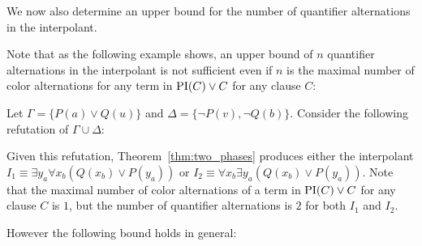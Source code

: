 We now also determine an upper bound for the number of quantifier alternations in the interpolant.

Note that as the following example shows, 
an upper bound of $n$ quantifier alternations in the interpolant is not sufficient even if $n$ is the maximal number of color alternations for any term in $\PI(C) \lor C$ for any clause $C$:

\begin{exa}
	Let $\Gamma = \{ P(a) \lor Q(u) \}$ and $\Delta = \{ \lnot P(v), \lnot Q(b) \}$.
	Consider the following refutation of $\Gamma \cup \Delta$:
	\begin{prooftree}


	\end{prooftree}

	Given this refutation, Theorem~\ref{thm:two_phases} produces either the interpolant
	$I_1 \equiv \exists y_a \forall x_b ( Q(x_b) \lor P(y_a) )$
	or 
	$I_2 \equiv \forall x_b \exists y_a ( Q(x_b) \lor P(y_a) )$.
	Note that the maximal number of color alternations of a term in $\PI(C) \lor C$ for any clause $C$ is $1$, but the number of quantifier alternations is $2$ for both $I_1$ and $I_2$.
\end{exa}

However the following bound holds in general:

